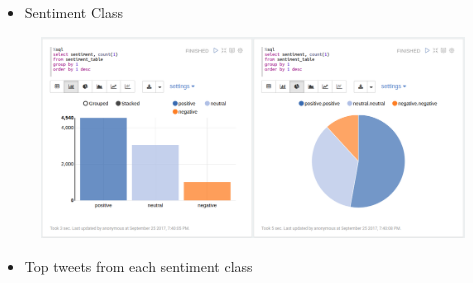 \documentclass[letterpaper,11pt,english]{sphinxmanual}
\begin{document}
\begin{itemize}
\item {} 
Sentiment Class

\end{itemize}
\begin{figure}[htbp]
\centering

\includegraphics{sen_class.png}
\end{figure}
\begin{itemize}
\item {} 
Top tweets from each sentiment class

\end{itemize}
\end{document}
